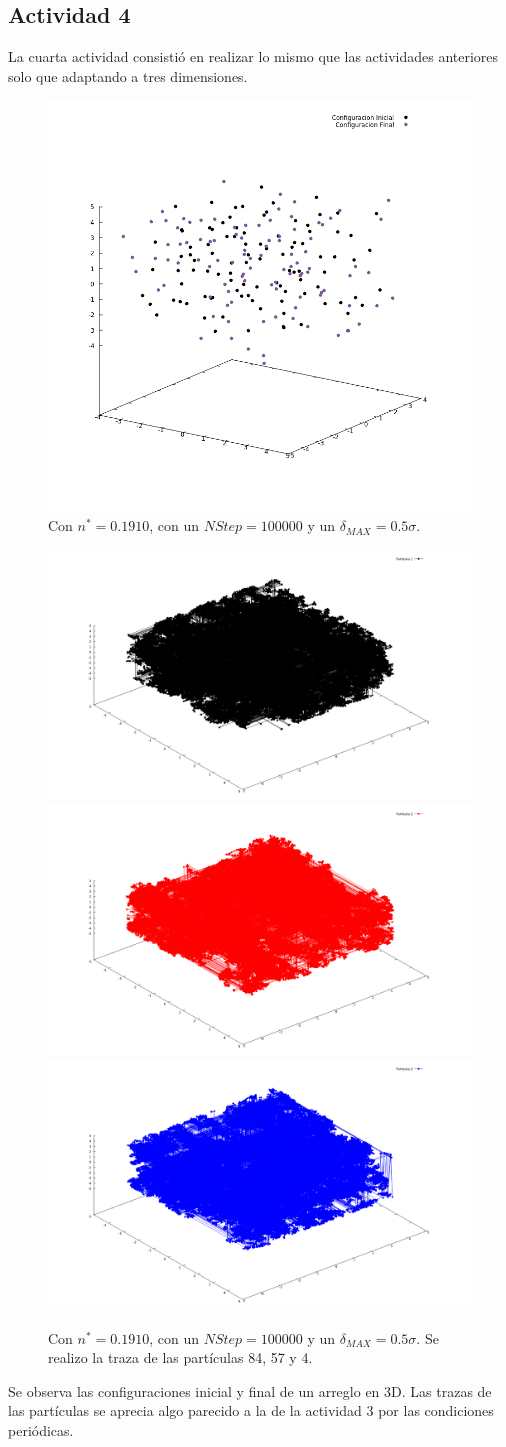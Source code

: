 \documentclass[12pt,letterpaper]{article}
\begin{document}
\subsection*{Actividad 4}
La cuarta actividad consistió en realizar lo mismo que las actividades anteriores solo que adaptando a tres dimensiones.
	\begin{figure}[H]
		\centering
		\includegraphics[width=0.5\linewidth]{ConfigS3D.png}
		\caption{ Con $n^*=0.1910$, con un $NStep=100000$ y un $\delta_{MAX}=0.5\sigma$.}
	\end{figure}
	\begin{figure}[H]
		\centering
		\includegraphics[width=0.49\linewidth]{Part1.png}
		\includegraphics[width=0.49\linewidth]{Part2.png}
		\includegraphics[width=0.49\linewidth]{Part3.png}
		\caption{Con $n^*=0.1910$, con un $NStep=100000$ y un $\delta_{MAX}=0.5\sigma$. Se realizo la traza de las partículas 84, 57 y 4.}
	\end{figure}
Se observa las configuraciones inicial y final de un arreglo en 3D. Las trazas de las partículas se aprecia algo parecido a la de la actividad 3 por las condiciones periódicas.
\end{document}

